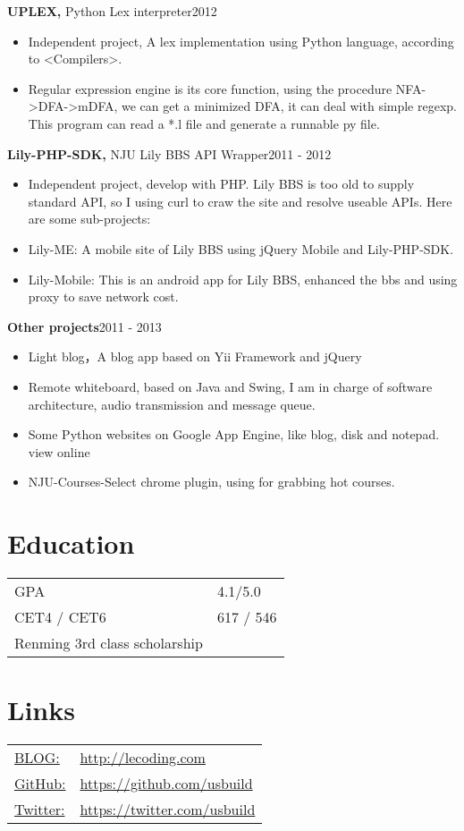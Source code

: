 \documentclass[margin]{res}
\begin{document}
\begin{resume}
{\bf UPLEX,} Python Lex interpreter\hfill 2012
\begin{itemize} \itemsep -2pt
  \item Independent project, A lex implementation using Python language, according to <Compilers>.
  \item Regular expression engine is its core function, using the procedure NFA->DFA->mDFA, we can get a minimized DFA, it can deal with simple regexp. This program can read a *.l file and generate a runnable py file.
\end{itemize}

{\bf Lily-PHP-SDK,} NJU Lily BBS API Wrapper\hfill 2011 - 2012
\begin{itemize} \itemsep -2pt
  \item Independent project, develop with PHP. Lily BBS is too old to supply standard API, so I using curl to craw the site and resolve useable APIs. Here are some sub-projects:
  \item Lily-ME: A mobile site of Lily BBS using jQuery Mobile and Lily-PHP-SDK.
  \item Lily-Mobile: This is an android app for Lily BBS, enhanced the bbs and using proxy to save network cost.
\end{itemize}

{\bf Other projects}\hfill 2011 - 2013
\begin{itemize} \itemsep -2pt
  \item Light blog，A blog app based on Yii Framework and jQuery
  \item Remote whiteboard, based on Java and Swing, I am in charge of software architecture, audio transmission and message queue.
  \item Some Python websites on Google App Engine, like blog, disk and notepad. view online
  \item NJU-Courses-Select chrome plugin, using for grabbing hot courses.
\end{itemize}

\section{Education} 
\begin{tabular}{l p{3in}}
  GPA &  4.1/5.0 \\
  CET4 / CET6 & 617 / 546 \\
  Renming 3rd class scholarship
\end{tabular}

\section{Links}
\begin{tabular}{l p{3in}}
  \underline{BLOG:} & \href{http://lecoding.com}{http://lecoding.com}\\
  \underline{GitHub:} &  \href{https://github.com/usbuild}{https://github.com/usbuild}\\
  \underline{Twitter:} & \href{https://twitter.com/usbuild}{https://twitter.com/usbuild}
\end{tabular}

\end{resume} 
\end{document}
